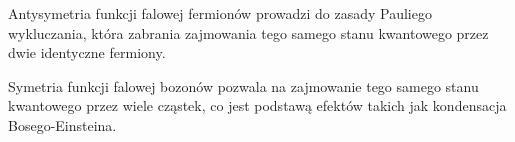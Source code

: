 Antysymetria funkcji falowej fermionów prowadzi do zasady Pauliego wykluczania, która zabrania zajmowania tego samego stanu kwantowego przez dwie identyczne fermiony.

Symetria funkcji falowej bozonów pozwala na zajmowanie tego samego stanu kwantowego przez wiele cząstek, co jest podstawą efektów takich jak kondensacja Bosego-Einsteina.
